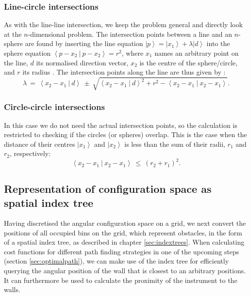\subsubsection*{Line-circle intersections}
As with the line-line intersection, we keep the problem general and directly look at the $n$-dimensional problem.
The intersection points between a line and an $n$-sphere are found by inserting the line equation 
$\left|p\right> = \left|x_1\right> + \lambda \left|d\right>$ into the sphere equation 
$\left< p-x_2 \ |\  p-x_2 \right> = r^2$, where $x_1$ names an arbitrary point on the line, $d$ its normalised 
direction vector, $x_2$ is the centre of the sphere/circle, and $r$ its radius \cite{wiki_line_sphere_intersection}.
The intersection points along the line are thus given by \cite{wiki_line_sphere_intersection}:
\begin{equation}
	\lambda \ =\ \left< x_2 - x_1 \  |\  d \right>
		\ \pm\ \sqrt{ \left< x_2 - x_1 \  |\  d \right>^2 
			+ r^2 - \left< x_2 - x_1 \ |\  x_2 - x_1 \right>}.
\end{equation}



\subsubsection*{Circle-circle intersections}
In this case we do not need the actual intersection points, so the calculation is restricted to checking if
the circles (or spheres) overlap. This is the case when the distance of their centres 
$\left| x_1 \right>$ and $\left| x_2 \right>$ is less than the sum of their radii, $r_1$ and $r_2$, respectively:
\begin{equation}
	\left< x_2 - x_1 \ |\ x_2 - x_1  \right> \ \leq \ \left( r_2 + r_1 \right)^2.
\end{equation}




\subsection{Representation of configuration space as spatial index tree}
\label{sec:walls_index_tree}
Having discretised the angular configuration space on a grid, we next convert the positions
of all occupied bins on the grid, which represent obstacles, in the form of a spatial index tree,
as described in chapter \ref{sec:indextrees}.
When calculating cost functions for different path finding strategies in one of the upcoming steps 
(section \ref{sec:optimalpath}), we can make use of the index tree for efficiently querying
the angular position of the wall that is closest to an arbitrary positions. 
It can furthermore be used to calculate the proximity of the instrument to the walls.

